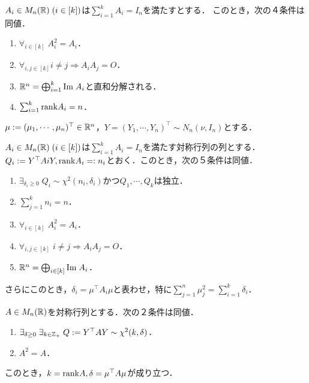 \documentclass[uplatex,dvipdfmx]{jsreport}
\begin{document}
\begin{proposition}
    $A_i\in M_n(\mathbb{R})\;(i\in[k])$は$\sum_{i=1}^kA_i=I_n$を満たすとする．
    このとき，次の４条件は同値．
    \begin{enumerate}
        \item $\forall_{i\in[k]}\;A_i^2=A_i$．
        \item $\forall_{i,j\in[k]}i\ne j\Rightarrow A_iA_j=O$．
        \item $\mathbb{R}^n=\bigoplus_{i=1}^k\mathrm{Im}\; A_i$と直和分解される．
        \item $\sum^k_{i=1}\mathrm{rank} A_i=n$．
    \end{enumerate}
\end{proposition}

\begin{notation}
    $\mu:=(\mu_1,\cdots,\mu_n)^\top\in\mathbb{R}^n$，$Y=(Y_1,\cdots,Y_n)^\top\sim N_n(\nu,I_n)$とする．
\end{notation}

\begin{theorem}
    $A_i\in M_n(\mathbb{R})\;(i\in[k])$は$\sum_{i=1}^kA_i=I_n$を満たす対称行列の列とする．
    $Q_i:=Y^\top AiY,\mathrm{rank} A_i=:n_i$とおく．このとき，次の５条件は同値．
    \begin{enumerate}
        \item $\exists_{\delta_i\ge0}\;Q_i\sim\chi^2(n_i,\delta_i)$かつ$Q_1,\cdots,Q_k$は独立．
        \item $\sum^k_{j=1}n_i=n$．
        \item $\forall_{i\in[k]}\;A^2_i=A_i$．
        \item $\forall_{i,j\in[k]}\;i\ne j\Rightarrow A_iA_j=O$．
        \item $\mathbb{R}^n=\bigoplus_{i\in[k]}\mathrm{Im}\; A_i$．
    \end{enumerate}
    さらにこのとき，$\delta_i=\mu^\top A_i\mu$と表わせ，特に$\sum^n_{j=1}\mu_j^2=\sum^k_{i=1}\delta_i$．
\end{theorem}

\begin{corollary}
    $A\in M_n(\mathbb{R})$を対称行列とする．次の２条件は同値．
    \begin{enumerate}
        \item $\exists_{\delta\ge0}\;\exists_{k\in\mathbb{Z}_+}\;Q:=Y^\top AY\sim\chi^2(k,\delta)$．
        \item $A^2=A$．
    \end{enumerate}
    このとき，$k=\mathrm{rank} A,\delta=\mu^\top A\mu$が成り立つ．
\end{corollary}
\end{document}

